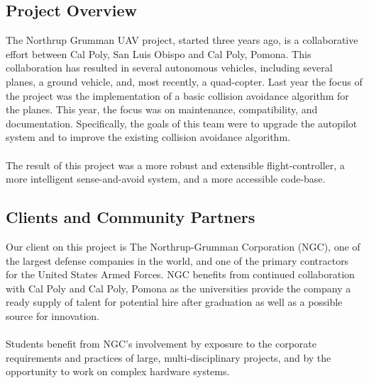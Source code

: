 \documentclass[12pt]{article}
\begin{document}
\subsection{Project Overview}
The Northrup Grumman UAV project, started three years ago, is a collaborative effort between Cal Poly, San Luis Obispo and Cal Poly, Pomona. This collaboration has resulted in several autonomous vehicles, including several planes, a ground vehicle, and, most recently, a quad-copter. Last year the focus of the project was the implementation of a basic collision avoidance algorithm for the planes. This year, the focus was on maintenance, compatibility, and documentation. Specifically, the goals of this team were to upgrade the autopilot system and to improve the existing collision avoidance algorithm.\\\\
The result of this project was a more robust and extensible flight-controller, a more intelligent sense-and-avoid system, and a more accessible code-base.

\subsection{Clients and Community Partners}
Our client on this project is The Northrup-Grumman Corporation (NGC), one of the largest defense companies in the world, and one of the primary contractors for the United States Armed Forces. NGC benefits from continued collaboration with Cal Poly and Cal Poly, Pomona as the universities provide the company a ready supply of talent for potential hire after graduation as well as a possible source for innovation.\\\\
Students benefit from NGC's involvement by exposure to the corporate requirements and practices of large, multi-disciplinary projects, and by the opportunity to work on complex hardware systems.

\end{document}
